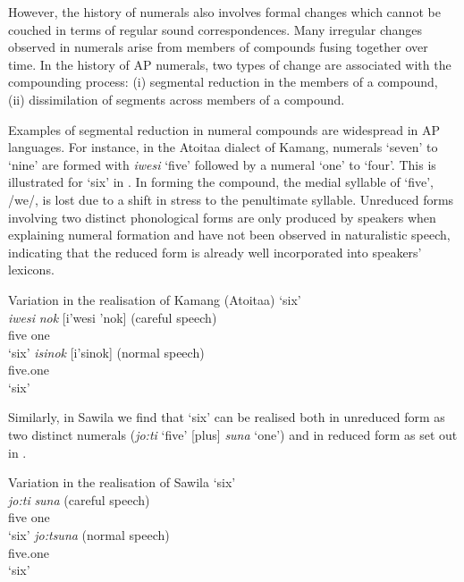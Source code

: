 \documentclass[output=paper]{LSP/langsci}
\begin{document}
  However, the history of numerals also involves formal changes which cannot be couched in terms of regular sound correspondences. Many irregular changes observed in numerals arise from members of compounds fusing together over time. In the history of AP numerals, two  types of change are associated with the compounding process: (i) segmental reduction in the members of a compound, (ii) dissimilation of segments across members of a compound. 

Examples of segmental reduction in numeral compounds are widespread in AP languages. For instance, in the Atoitaa dialect of Kamang, numerals `seven' to `nine' are formed with \textit{iwesi}\textit{{\ng}} `five' followed by a numeral `one' to `four'. This is illustrated for `six' in . In forming the compound, the medial syllable of `five', /we/, is lost due to a shift in stress to the penultimate syllable. Unreduced forms involving two distinct phonological forms are only produced by speakers when explaining numeral formation and have not been observed in naturalistic speech, indicating that the reduced form is already well incorporated into speakers' lexicons.



\ea%
\label{ex:6:1}
  Variation in the realisation of Kamang (Atoitaa) `six'\\
\ea
\gll\textit{iwesi}\textit{{\ng}} \textit{nok}    [i'wesi{\ng} 'nok]    (careful speech)\\
      five    one    \\
\glt `six'
\ex
\gll\textit{isi}\textit{{\ng}}\textit{nok}        [i'si{\ng}nok]    (normal speech)\\
     five.one  \\
\glt`six'
\z
\z

 
    

Similarly, in Sawila we find that `six' can be realised both in unreduced form as two distinct numerals (\textit{jo:ti}\textit{{\ng}} `five' [plus] \textit{suna} `one') and in reduced form as set out in .  



\ea%
\label{ex:6:2}
Variation in the realisation of Sawila `six'\\
\ea
\gll\textit{jo:ti}\textit{{\ng}} \textit{suna}          (careful speech)\\
    five    one     \\
\glt`six'
\ex
\gll\textit{jo:tsuna}            (normal speech)\\
      five.one  \\
\glt   `six'
\z
\z
\end{document}
